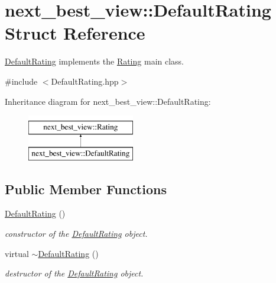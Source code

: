 \hypertarget{structnext__best__view_1_1DefaultRating}{\section{next\-\_\-best\-\_\-view\-:\-:\-Default\-Rating \-Struct \-Reference}
\label{structnext__best__view_1_1DefaultRating}
}


\hyperlink{structnext__best__view_1_1DefaultRating}{\-Default\-Rating} implements the \hyperlink{structnext__best__view_1_1Rating}{\-Rating} main class.  




{\ttfamily \#include $<$\-Default\-Rating.\-hpp$>$}

\-Inheritance diagram for next\-\_\-best\-\_\-view\-:\-:\-Default\-Rating\-:\begin{figure}[H]
\begin{center}
\leavevmode
\includegraphics[height=2.000000cm]{structnext__best__view_1_1DefaultRating}
\end{center}
\end{figure}
\subsection*{\-Public \-Member \-Functions}
\begin{DoxyCompactItemize}
\item 
\hyperlink{structnext__best__view_1_1DefaultRating_a15ebaa5642c70c7794be1be11cdbbdae}{\-Default\-Rating} ()
\begin{DoxyCompactList}\small\item\em constructor of the \hyperlink{structnext__best__view_1_1DefaultRating}{\-Default\-Rating} object. \end{DoxyCompactList}\item 
virtual \hyperlink{structnext__best__view_1_1DefaultRating_a6a6899cb244f213ace80135d9049f55f}{$\sim$\-Default\-Rating} ()
\begin{DoxyCompactList}\small\item\em destructor of the \hyperlink{structnext__best__view_1_1DefaultRating}{\-Default\-Rating} object. \end{DoxyCompactList}\end{DoxyCompactItemize}
